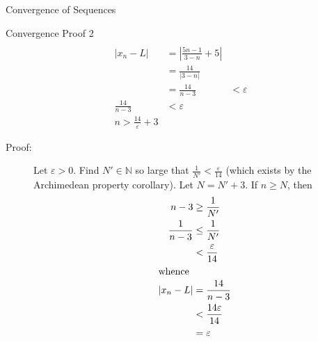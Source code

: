 \documentclass[8pt]{extarticle}
\newcommand{\N}{\mathbb{N}}
\begin{document}
\begin{problem}{Convergence of Sequences}
\begin{problem}{Convergence Proof 2}
\begin{align*}
      \end{align*}
      \tcblower
      \begin{align*}
        |x_n - L| &= \left|\frac{5n-1}{3-n} + 5\right|\\
                  &= \frac{14}{|3-n|}\\
                  &= \frac{14}{n-3}
                  &< \varepsilon\\
        \frac{14}{n-3} &< \varepsilon\\
        n > \frac{14}{\varepsilon} + 3
      \end{align*}
      \begin{description}
        \item[Proof:] Let $\varepsilon > 0$. Find $N' \in\N$ so large that $\frac{1}{N'} < \frac{\varepsilon}{14}$ (which exists by the Archimedean property corollary). Let $N = N' + 3$. If $n \geq N$, then
          \begin{align*}
            n-3 &\geq \frac{1}{N'}\\
            \frac{1}{n-3} &\leq \frac{1}{N'}\\
                          &< \frac{\varepsilon}{14}\\
                          \shortintertext{whence}
            |x_n - L| &= \frac{14}{n-3}\\
                      &< \frac{14\varepsilon}{14}\\
                      &= \varepsilon
          \end{align*}
      \end{description}
    \end{problem}
  \end{problem}
\end{document}

